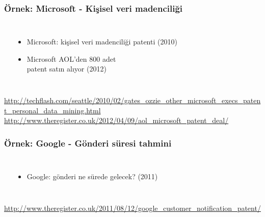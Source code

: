 \documentclass[dvipsnames]{beamer}
\theoremstyle{definition}
\theoremstyle{example}
\theoremstyle{plain}
\begin{document}
\begin{frame}
  \frametitle{Örnek: Microsoft - Kişisel veri madenciliği}

  \begin{columns}
    \begin{center}
    \end{center}

    \begin{itemize}
      \item Microsoft: kişisel veri madenciliği patenti (2010)
      \item Microsoft AOL'den 800 adet\\
        patent satın alıyor (2012)
    \end{itemize}
  \end{columns}

  \medskip
  \tiny{\url{http://techflash.com/seattle/2010/02/gates_ozzie_other_microsoft_execs_patent_personal_data_mining.html}}\\
  \tiny{\url{http://www.theregister.co.uk/2012/04/09/aol_microsoft_patent_deal/}}\\
\end{frame}

\begin{frame}
  \frametitle{Örnek: Google - Gönderi süresi tahmini}

  \begin{columns}
    \begin{center}
    \end{center}

    \begin{itemize}
      \item Google: gönderi ne sürede gelecek? (2011)
    \end{itemize}
  \end{columns}

  \medskip
  \tiny{\url{http://www.theregister.co.uk/2011/08/12/google_customer_notification_patent/}}\\
\end{frame}
\end{document}
